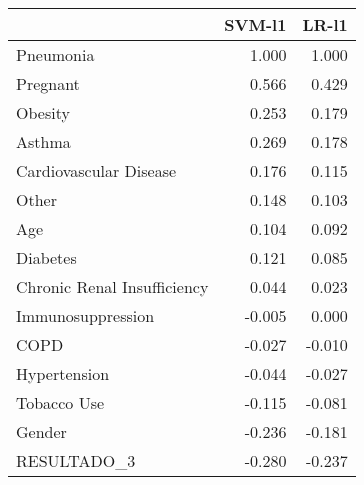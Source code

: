 \begin{tabular}{lrr}
\toprule
{} &  SVM-l1 &  LR-l1 \\
\midrule
Pneumonia                   &   1.000 &  1.000 \\
Pregnant                    &   0.566 &  0.429 \\
Obesity                     &   0.253 &  0.179 \\
Asthma                      &   0.269 &  0.178 \\
Cardiovascular Disease      &   0.176 &  0.115 \\
Other                       &   0.148 &  0.103 \\
Age                         &   0.104 &  0.092 \\
Diabetes                    &   0.121 &  0.085 \\
Chronic Renal Insufficiency &   0.044 &  0.023 \\
Immunosuppression           &  -0.005 &  0.000 \\
COPD                        &  -0.027 & -0.010 \\
Hypertension                &  -0.044 & -0.027 \\
Tobacco Use                 &  -0.115 & -0.081 \\
Gender                      &  -0.236 & -0.181 \\
RESULTADO\_3                 &  -0.280 & -0.237 \\
\bottomrule
\end{tabular}
